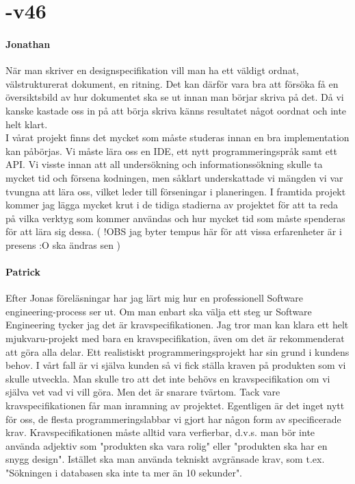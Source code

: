 \documentclass{article}
\begin{document}
\newpage

\section*{-v46}

\paragraph{Jonathan}
När man skriver en designspecifikation vill man ha ett väldigt ordnat, välstrukturerat dokument, en ritning.
Det kan därför vara bra att försöka få en översiktsbild av hur dokumentet ska se ut innan man börjar skriva på det.
Då vi kanske kastade oss in på att börja skriva känns resultatet något oordnat och inte helt klart.
\\
I vårat projekt finns det mycket som måste studeras innan en bra implementation kan påbörjas. Vi måste lära oss en IDE, ett
nytt programmeringspråk samt ett API. Vi visste innan att all undersökning och informationssökning skulle ta mycket tid och försena
kodningen, men såklart underskattade vi mängden vi var tvungna att lära oss, vilket leder till förseningar i planeringen.
I framtida projekt kommer jag lägga mycket krut i de tidiga stadierna av projektet för att ta reda på vilka verktyg som kommer
användas och hur mycket tid som måste spenderas för att lära sig dessa. ( !OBS jag byter tempus här för att vissa erfarenheter är i presens :O ska ändras sen )

\paragraph{Patrick}
Efter Jonas föreläsningar har jag lärt mig hur en professionell Software engineering-process ser ut. Om man enbart ska välja ett steg ur Software Engineering tycker jag det är kravspecifikationen. Jag tror man kan klara ett helt mjukvaru-projekt med bara en kravspecifikation, även om det är rekommenderat att göra alla delar. Ett realistiskt programmeringsprojekt har sin grund i kundens behov. I vårt fall är vi själva kunden så vi fick ställa kraven på produkten som vi skulle utveckla. Man skulle tro att det inte behövs en kravspecifikation om vi själva vet vad vi vill göra. Men det är snarare tvärtom. Tack vare kravspecifikationen får man inramning av projektet. Egentligen är det inget nytt för oss, de flesta programmeringslabbar vi gjort har någon form av specificerade krav. Kravspecifikationen måste alltid vara verfierbar, d.v.s. man bör inte använda adjektiv som "produkten ska vara rolig" eller "produkten ska har en snygg design". Istället ska man använda tekniskt avgränsade krav, som t.ex. "Sökningen i databasen ska inte ta mer än 10 sekunder".
\end{document}
